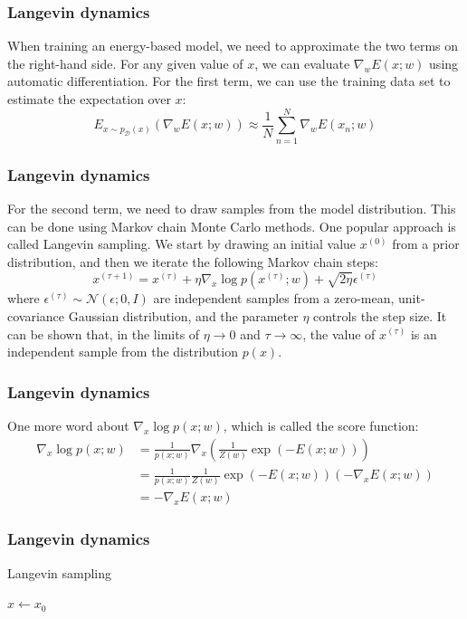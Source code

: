 \documentclass{beamer}
\begin{document}
\begin{frame}
    \frametitle{Langevin dynamics}
    When training an energy-based model, we need to approximate the two terms on the right-hand side. For any given value of $x$, we can evaluate $\nabla_{w}E(x;w)$ using automatic differentiation. For the first term, we can use the training data set to estimate the expectation over $x$:
    \begin{equation*}
        E_{x\sim{}p_{\mathcal{D}}(x)}(\nabla_{w}E(x;w))\approx\frac{1}{N}\sum_{n=1}^{N}\nabla_{w}E(x_{n};w)
    \end{equation*}
\end{frame}

\begin{frame}
    \frametitle{Langevin dynamics}
    For the second term, we need to draw samples from the model distribution. This can be done using Markov chain Monte Carlo methods. One popular approach is called Langevin sampling. We start by drawing an initial value $x^{(0)}$ from a prior distribution, and then we iterate the following Markov chain steps:
    \begin{equation*}
        x^{(\tau+1)}=x^{(\tau)}+\eta\nabla_{x}\log{}p(x^{(\tau)};w)+\sqrt{2\eta}\epsilon^{(\tau)}
    \end{equation*}
    where $\epsilon^{(\tau)}\sim\mathcal{N}(\epsilon;0,I)$ are independent samples from a zero-mean, unit-covariance Gaussian distribution, and the parameter $\eta$ controls the step size. It can be shown that, in the limits of $\eta\to{}0$ and $\tau\to\infty$, the value of $x^{(\tau)}$ is an independent sample from the distribution $p(x)$.
\end{frame}

\begin{frame}
    \frametitle{Langevin dynamics}
    One more word about $\nabla_{x}\log{}p(x;w)$, which is called the score function:
    \begin{align*}
        \nabla_{x}\log{}p(x;w)&=\frac{1}{p(x;w)}\nabla_{x}(\frac{1}{Z(w)}\exp(-E(x;w))) \\
        &=\frac{1}{p(x;w)}\frac{1}{Z(w)}\exp(-E(x;w))(-\nabla_{x}E(x;w)) \\
        &=-\nabla_{x}E(x;w)
    \end{align*}
\end{frame}

\begin{frame}
    \frametitle{Langevin dynamics}
    \begin{algorithm}[H]
        \caption{Langevin sampling}
        $x\gets{}x_{0}$\;
        \;
    \end{algorithm}
\end{frame}
\end{document}
